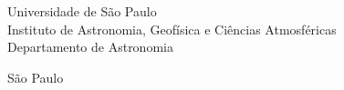 
\thispagestyle{empty}%
\begin{center}
  \Large{
    Universidade de São Paulo \\
    Instituto de Astronomia, Geofísica e Ciências Atmosféricas \\
    Departamento de Astronomia
  }
  
  \vspace*{3cm}

  \LARGE{\authorname}

  \vspace{3cm}

  \begin{center}
    \begin{huge}
      \textbf{\thesistitle}
    \end{huge}
  \end{center}

  \vfill

  \Large{
    São Paulo \\
    \the\year\\
  }
\end{center}

\newpage
\shipout\null %









